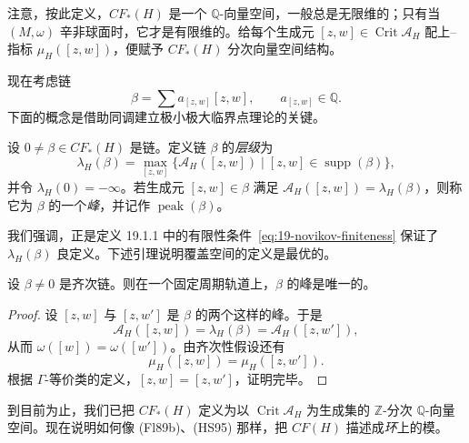 注意，按此定义，$CF_*(H)$ 是一个 $\mathbb Q$-向量空间，一般总是无限维的；只有当
$(M,\omega)$ 辛非球面时，它才是有限维的。给每个生成元
$[z,w]\in\operatorname{Crit}\mathcal A_H$ 配上\personConley{}--\personZehnder{}指标
$\mu_H([z,w])$，便赋予 $CF_*(H)$ 分次向量空间结构。

现在考虑\personFloer{}链
\[
 \beta=\sum a_{[z,w]}[z,w],\qquad a_{[z,w]}\in\mathbb Q.
\]
下面的概念是借助\personFloer{}同调建立极小极大临界点理论的关键。

\begin{definition}
\label{def:floer-chain-level-peak}
设 $0\neq\beta\in CF_*(H)$ 是\personFloer{}链。定义链 $\beta$ 的\emph{层级}为
\[
 \lambda_H(\beta)=\max_{[z,w]}
 \{\mathcal A_H([z,w])\mid[z,w]\in\operatorname{supp}(\beta)\},
\]
并令 $\lambda_H(0)=-\infty$。若生成元 $[z,w]\in\beta$ 满足
$\mathcal A_H([z,w])=\lambda_H(\beta)$，则称它为 $\beta$ 的一个\emph{峰}，并记作
$\operatorname{peak}(\beta)$。
\end{definition}

我们强调，正是定义 19.1.1 中的\personNovikov{}有限性条件~\eqref{eq:19-novikov-finiteness}
保证了 $\lambda_H(\beta)$ 良定义。下述引理说明\personNovikov{}覆盖空间的定义是最优的。

\begin{lemma}
\label{lem:unique-peak-fixed-orbit}
设 $\beta\neq0$ 是齐次\personFloer{}链。则在一个固定周期轨道上，$\beta$ 的峰是唯一的。
\end{lemma}

\begin{proof}
设 $[z,w]$ 与 $[z,w']$ 是 $\beta$ 的两个这样的峰。于是
\[
 \mathcal A_H([z,w])=\lambda_H(\beta)=\mathcal A_H([z,w']),
\]
从而 $\omega([w])=\omega([w'])$。由齐次性假设还有
\[
 \mu_H([z,w])=\mu_H([z,w']).
\]
根据 $\Gamma$-等价类的定义，$[z,w]=[z,w']$，证明完毕。
\end{proof}

到目前为止，我们已把 $CF_*(H)$ 定义为以
$\operatorname{Crit}\mathcal A_H$ 为生成集的 $\mathbb Z$-分次
$\mathbb Q$-向量空间。现在说明如何像 (Fl89b)、(HS95) 那样，把 $CF(H)$ 描述成\emph{\personNovikov{}环}上的模。

